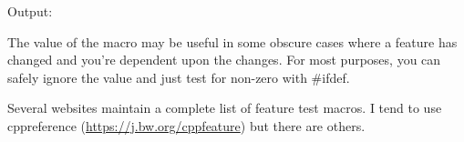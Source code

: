 Output:


The value of the macro may be useful in some obscure cases where a feature has changed and you're dependent upon the changes. For most purposes, you can safely ignore the value and just test for non-zero with \#ifdef.

Several websites maintain a complete list of feature test macros. I tend to use cppreference (\url{https://j.bw.org/cppfeature}) but there are others.








